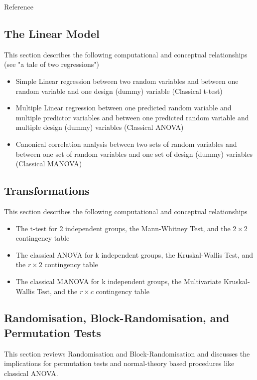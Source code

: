 Reference \cite{conover1981}


\subsection{The Linear Model}

This section describes the following computational and conceptual relationships (see "a tale of two regressions")


\begin{itemize}
	\item Simple Linear regression between two random variables and between one random variable and one design (dummy)  variable (Classical t-test)
	\item Multiple Linear regression between one predicted random variable and multiple predictor variables and between one predicted random variable and multiple design (dummy)  variables (Classical ANOVA)
	\item Canonical correlation analysis between two sets of random variables and between one set of random variables and one set of design (dummy)  variables (Classical MANOVA)
\end{itemize}


\subsection{Transformations}

This section describes the following computational and conceptual relationships

\begin{itemize}
	\item The t-test for 2 independent groups, the Mann-Whitney Test, and the $2 \times 2$ contingency table
	\item The classical ANOVA for k independent groups, the Kruskal-Wallis Test, and the $r \times 2$ contingency table
	\item The classical MANOVA for k independent groups, the Multivariate Kruskal-Wallis Test, and the $r \times c$ contingency table
\end{itemize}



\subsection{Randomisation, Block-Randomisation, and Permutation Tests}

This section reviews Randomisation and Block-Randomisation and discusses the implications for permutation tests and normal-theory based procedures like classical ANOVA.


